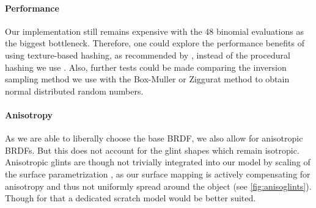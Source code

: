 \paragraph{Performance}
%
Our implementation still remains expensive with the 48 binomial evaluations as the biggest bottleneck.
%
Therefore, one could explore the performance benefits of using texture-based hashing, as recommended by \textcite{deliot2023}, instead of the procedural hashing we use \parencite{jarzynski2020}.
%
Also, further tests could be made comparing the inversion sampling method we use \parencite[see][]{giles2012} with the Box-Muller \parencite{box1958} or Ziggurat method to obtain normal distributed random numbers.

\paragraph{Anisotropy}
%
As we are able to liberally choose the base BRDF, we also allow for anisotropic BRDFs.
%
But this does not account for the glint shapes which remain isotropic. 
%
Anisotropic glints are though not trivially integrated into our model by scaling of the surface parametrization \parencite{chermain2020a,zirr2016}, as our surface mapping is actively compensating for anisotropy and thus not uniformly spread around the object (see \cref{fig:anisoglints}).
%
Though for that a dedicated scratch model \parencite[e.g.][]{velinov2018} would be better suited.

